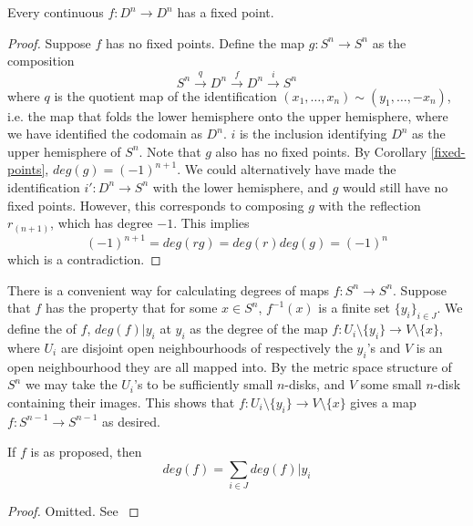 \begin{theorem}
Every continuous $f:D^n\rightarrow D^n$ has a fixed point.
\end{theorem}
\begin{proof}
Suppose $f$ has no fixed points. Define the map $g:S^n\rightarrow S^n$ as the composition 
$$S^n\xrightarrow{q}D^n\xrightarrow{f}D^n\xrightarrow{i}S^n$$
where $q$ is the quotient map of the identification $(x_1,\dots,x_n)\sim (y_1,\dots,-x_n)$, i.e. the map that folds the lower hemisphere onto the upper hemisphere, where we have identified the codomain as $D^n$. $i$ is the inclusion identifying $D^n$ as the upper hemisphere of $S^n$. Note that $g$ also has no fixed points. By Corollary \ref{fixed-points}, $deg(g)=(-1)^{n+1}$. We could alternatively have made the identification $i':D^n\rightarrow S^n$ with the lower hemisphere, and $g$ would still have no fixed points. However, this corresponds to composing $g$ with the reflection $r_{(n+1)}$, which has degree $-1$. This implies
$$(-1)^{n+1}=deg(rg)=deg(r)deg(g)=(-1)^{n}$$
which is a contradiction.
\end{proof}


There is a convenient way for calculating degrees of maps $f:S^n\rightarrow S^n$. Suppose that $f$ has the property that for some $x\in S^n$, $f^{-1}(x)$ is a finite set $\{y_i\}_{i\in J}$. We define the  of $f$, $deg(f)|{y_i}$ at $y_i$ as the degree of the map $f:U_i\setminus \{y_i\}\rightarrow V\setminus\{x\}$, where $U_i$ are disjoint open neighbourhoods of respectively the $y_i$'s and $V$ is an open neighbourhood they are all mapped into. By the metric space structure of $S^n$ we may take the $U_i$'s to be sufficiently small $n$-disks, and $V$ some small $n$-disk containing their images. This shows that $f:U_i\setminus \{y_i\}\rightarrow V\setminus\{x\}$ gives a map $f:S^{n-1}\rightarrow S^{n-1}$ as desired.

\begin{proposition}\label{local-degree}
If $f$ is as proposed, then $$deg(f)=\sum_{i\in J}deg(f)|{y_i}$$
\end{proposition}
\begin{proof}
Omitted. See \cite{Hatcher}
\end{proof}